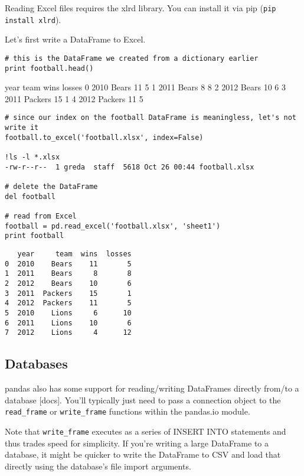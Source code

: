 Reading Excel files requires the xlrd library. You can install it via pip (\texttt{pip install xlrd}).

Let's first write a DataFrame to Excel.

\begin{framed}
\begin{verbatim}
# this is the DataFrame we created from a dictionary earlier
print football.head()
\end{verbatim}
\end{framed}
   year     team  wins  losses
0  2010    Bears    11       5
1  2011    Bears     8       8
2  2012    Bears    10       6
3  2011  Packers    15       1
4  2012  Packers    11       5

\begin{framed}
\begin{verbatim}
# since our index on the football DataFrame is meaningless, let's not write it
football.to_excel('football.xlsx', index=False)

!ls -l *.xlsx
-rw-r--r--  1 greda  staff  5618 Oct 26 00:44 football.xlsx

# delete the DataFrame
del football

# read from Excel
football = pd.read_excel('football.xlsx', 'sheet1')
print football
\end{verbatim}
\end{framed}
\begin{verbatim}
   year     team  wins  losses
0  2010    Bears    11       5
1  2011    Bears     8       8
2  2012    Bears    10       6
3  2011  Packers    15       1
4  2012  Packers    11       5
5  2010    Lions     6      10
6  2011    Lions    10       6
7  2012    Lions     4      12
\end{verbatim}


\subsection{Databases}

pandas also has some support for reading/writing DataFrames directly from/to a database [docs]. You'll typically just need to pass a connection object to the \texttt{read\_frame} or \texttt{write\_frame} functions within the pandas.io module.

Note that \texttt{write\_frame} executes as a series of INSERT INTO statements and thus trades speed for simplicity. If you're writing a large DataFrame to a database, it might be quicker to write the DataFrame to CSV and load that directly using the database's file import arguments.

